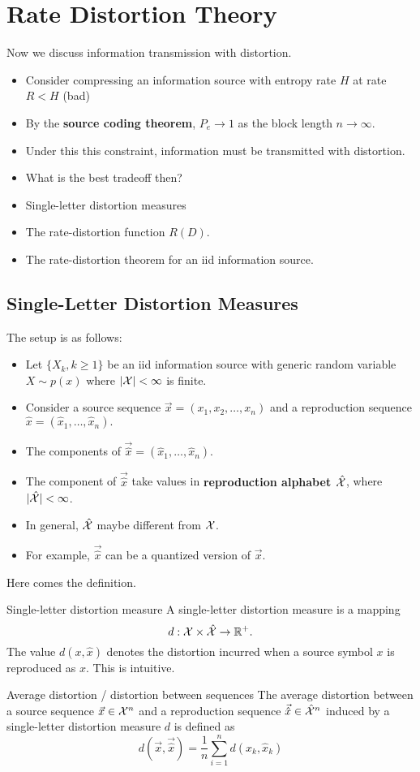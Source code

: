 \documentclass[../main.tex]{subfiles}
\begin{document}
\chapter{Rate Distortion Theory}
Now we discuss information transmission with distortion. \begin{itemize}
    \item Consider compressing an information source with entropy rate $H$ at rate $R < H$ (bad)
    \item By the \textbf{source coding theorem}, $P_e\to 1$ as the block length $n\to \infty$.
    \item Under this this constraint, information must be transmitted with distortion.
    \item What is the best tradeoff then?
\end{itemize}
\begin{itemize}
    \item Single-letter distortion measures
    \item The rate-distortion function $R(D)$.
    \item The rate-distortion theorem for an iid information source.
\end{itemize}
\section{Single-Letter Distortion Measures}
The setup is as follows: \begin{itemize}
    \item Let $\{X_k,k\geq 1\}$ be an iid information source with generic random variable $X\sim p(x)$ where $|\mathcal{X}|<\infty$ is finite.
    \item Consider a source sequence $\vec x = (x_1,x_2,\dots,x_n)$ and a reproduction sequence $\hat x = (\hat x_1,\dots,\hat x_n).$
    \item The components of $\vec {\hat x}=(\hat x_1,\dots, \hat x_n)$.
    \item The component of $\vec{\hat x}$ take values in \textbf{reproduction alphabet $\hat{\mathcal{X}}$}, where $|\hat{\mathcal{X}}| < \infty$.
    \item In general, $\hat {\mathcal{X}}$ maybe different from $\mathcal{X}$.
    \item For example, $\vec{\hat x}$ can be a quantized version of $\vec x$.
\end{itemize}
Here comes the definition.
\begin{gbox}{Single-letter distortion measure}
    A single-letter distortion measure is a mapping \[
    d: \mathcal{X} \times \hat {\mathcal{X}} \to \mathbb{R}^{+}.
    \]
    The value $d(x,\hat x)$ denotes the distortion incurred when a source symbol $x$ is reproduced as $\hat x$. This is intuitive.
\end{gbox}
\begin{gbox}{Average distortion / distortion between sequences}
    The average distortion between a source sequence $\vec x\in \mathcal{X}^n$ and a reproduction sequence $\vec{\hat x}\in \hat {\mathcal{X}}^n$ induced by a single-letter distortion measure $d$ is defined as \[
    d(\vec x, \vec{\hat x}) = \frac{1}{n}\sum_{i=1}^n d(x_k,\hat x_k)
    \]
\end{gbox}
\end{document}
